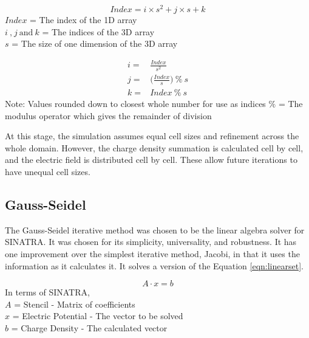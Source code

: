 \begin{equation}
    \label{eqn:to1D}
    Index = i \times s^2 + j \times s + k
\end{equation}
\(Index\) = The index of the 1D array \\
\(i \: \text{,} \: j \: \text{and} \: k\) = The indices of the 3D array \\
\(s\) = The size of one dimension of the 3D array \par

\begin{align}\label{eqn:to3D}
    i =& \frac{Index}{s^2} \nonumber \\
    j =& \Big(\frac{Index}{s}\Big) \: \% \: s \\
    k =& Index \: \% \: s \nonumber
\end{align}
Note: Values rounded down to closest whole number for use as indices \newline
\(\%\) = The modulus operator which gives the remainder of division \par






\indent At this stage, the simulation assumes equal cell sizes and refinement across the whole domain. However, the charge density summation is calculated cell by cell, and the electric field is distributed cell by cell. These allow future iterations to have unequal cell sizes. \par


\subsection{Gauss-Seidel}
\label{sec:gauss}

The Gauss-Seidel iterative method was chosen to be the linear algebra solver for SINATRA. It was chosen for its simplicity, universality, and robustness. It has one improvement over the simplest iterative method, Jacobi, in that it uses the information as it calculates it. It solves a version of the Equation \ref{eqn:linearset}.


\begin{equation}
    \label{eqn:linearset}
    A\cdot x = b
\end{equation}
In terms of SINATRA, \\
\(A\) = Stencil - Matrix of coefficients\\
\(x\) = Electric Potential - The vector to be solved \\
\(b\) = Charge Density - The calculated vector \par


